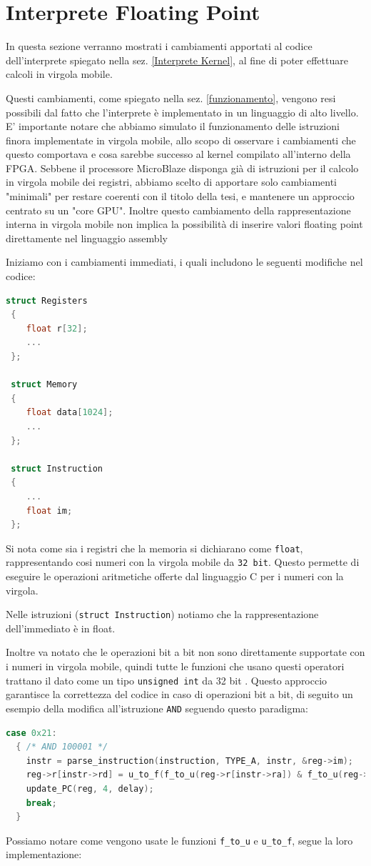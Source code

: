 \clearpage



\section{Interprete Floating Point}
\label{interpretefloating}
In questa sezione verranno mostrati i cambiamenti apportati al codice dell'interprete spiegato nella sez. \ref{Interprete Kernel}, al fine di poter effettuare calcoli in virgola mobile.


Questi cambiamenti, come spiegato nella sez. \ref{funzionamento}, vengono resi possibili dal fatto che l'interprete è implementato in un linguaggio di alto livello.
E' importante notare che abbiamo simulato il funzionamento delle istruzioni finora implementate in virgola mobile, allo scopo di osservare i cambiamenti che questo comportava e cosa sarebbe successo al kernel compilato all'interno della FPGA. Sebbene il processore MicroBlaze disponga già di istruzioni per il calcolo in virgola mobile dei registri, abbiamo scelto di apportare solo cambiamenti "minimali" per restare coerenti con il titolo della tesi, e mantenere un approccio centrato su un "core GPU". Inoltre questo cambiamento della rappresentazione interna in virgola mobile non implica la possibilità di inserire valori floating point direttamente nel linguaggio assembly

Iniziamo con i cambiamenti immediati, i quali includono le seguenti modifiche nel codice:
\begin{lstlisting}[language=C]
 struct Registers
 {
    float r[32];
    ...
 };
 
 struct Memory
 {
    float data[1024];
    ...
 };

 struct Instruction
 {
    ...
    float im;
 };
\end{lstlisting}
Si nota come sia i registri che la memoria si dichiarano come  \texttt{float}, rappresentando cosi numeri con la virgola mobile da \texttt{32 bit}. Questo permette di eseguire le operazioni aritmetiche offerte dal linguaggio C per i numeri con la virgola.

Nelle istruzioni (\texttt{struct Instruction}) notiamo che la rappresentazione dell'immediato è in float.

Inoltre va notato che le operazioni bit a bit non sono direttamente supportate con i numeri in virgola mobile, quindi tutte le funzioni che usano questi operatori trattano il dato come un tipo \texttt{unsigned int} da 32 bit . Questo approccio garantisce la correttezza del codice in caso di operazioni bit a bit, di seguito un esempio della modifica all'istruzione \texttt{AND} seguendo questo paradigma:
\begin{lstlisting}[language=C]
  case 0x21:
  { /* AND 100001 */
    instr = parse_instruction(instruction, TYPE_A, instr, &reg->im);
    reg->r[instr->rd] = u_to_f(f_to_u(reg->r[instr->ra]) & f_to_u(reg->r[instr->rb]));
    update_PC(reg, 4, delay);
    break;
  }
\end{lstlisting}
Possiamo notare come vengono usate le funzioni \texttt{f\_to\_u} e \texttt{u\_to\_f}, segue la loro implementazione: 

